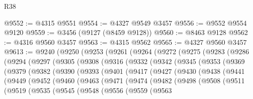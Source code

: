 \begin{lexlean}{R38}
\begin{coremodule}
@9552 := @4315 @9551
@9554 := @4327 @9549 @3457
@9556 := @9552 @9554 @9120
@9559 := @3456 (@9127 (@8459 @9128))
@9560 := @8463 @9128
@9562 := @4316 @9560 @3457
@9563 := @4315 @9562
@9565 := @4327 @9560 @3457
@9613 := @9240
    (@9250
      (@9253
        (@9261
          (@9264
            (@9272
              (@9275
                (@9283
                  (@9286
                    (@9294
                      (@9297
                        (@9305
                          (@9308
                            (@9316
                              (@9332
                                (@9342
                                  (@9345
                                    (@9353
                                      (@9369
                                        (@9379
                                          (@9382
                                            (@9390
                                              (@9393
                                                (@9401
                                                  (@9417
                                                    (@9427
                                                      (@9430
                                                        (@9438
                                                          (@9441
                                                            (@9449
                                                              (@9452
                                                                (@9460
                                                                  (@9463
                                                                    (@9471
                                                                      (@9474
                                                                        (@9482
                                                                          (@9498
                                                                            (@9508
                                                                              (@9511
                                                                                (@9519
                                                                                  (@9535
                                                                                    (@9545
                                                                                      (@9548
                                                                                        (@9556
                                                                                          (@9559
                                                                                            (@9563

\end{coremodule}
\end{lexlean}
